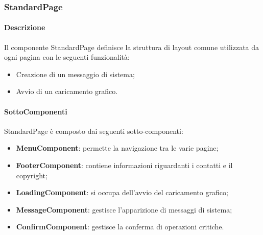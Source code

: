 \subsubsection{StandardPage} 
\label{sec:StandardPage}
\paragraph{Descrizione}
Il componente StandardPage definisce la struttura di layout comune utilizzata da ogni pagina con le seguenti funzionalità:
\begin{itemize}
    \item Creazione di un messaggio di sistema;
    \item Avvio di un caricamento grafico.
\end{itemize}  
\paragraph{SottoComponenti}
StandardPage è composto dai seguenti sotto-componenti:
\begin{itemize}
    \item \textbf{MenuComponent}: permette la navigazione tra le varie pagine;
    \item \textbf{FooterComponent}: contiene informazioni riguardanti i contatti e il copyright;
    \item \textbf{LoadingComponent}: si occupa dell'avvio del caricamento grafico;
    \item \textbf{MessageComponent}: gestisce l'apparizione di messaggi di sistema;
    \item \textbf{ConfirmComponent}: gestisce la conferma di operazioni critiche.
\end{itemize}